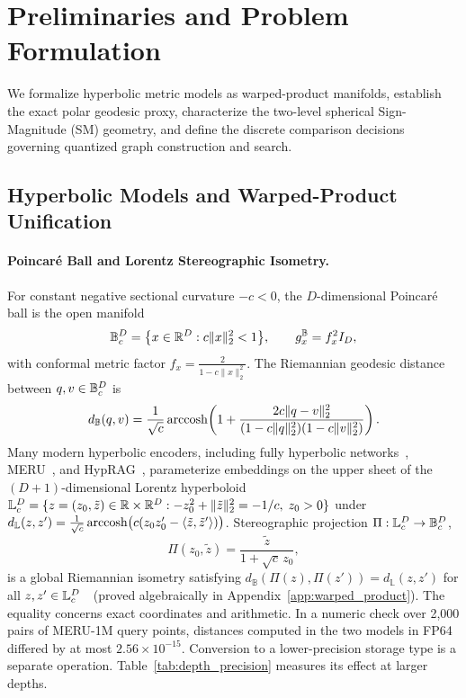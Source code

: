 \section{Preliminaries and Problem Formulation}
\label{sec:prelim}

We formalize hyperbolic metric models as warped-product manifolds, establish the exact polar geodesic proxy, characterize the two-level spherical Sign-Magnitude ({SM}) geometry, and define the discrete comparison decisions governing quantized graph construction and search.

\subsection{Hyperbolic Models and Warped-Product Unification}
\label{subsec:models}

\paragraph{{Poincar\'e} Ball and {Lorentz} Stereographic Isometry.}
For constant negative sectional curvature $-c < 0$, the $D$-dimensional {Poincar\'e} ball is the open manifold
\begin{equation}
  \mathbb{B}_c^D = \bigl\{x \in \mathbb{R}^D : c\|x\|_2^2 < 1\bigr\}, \qquad g_x^{\mathbb{B}} = f_x^2 I_D,
  \label{eq:poincare_manifold}
\end{equation}
with conformal metric factor $f_x = \frac{2}{1 - c\|x\|_2^2}$.
The Riemannian geodesic distance between $q, v \in \mathbb{B}_c^D$ is
\begin{equation}
  d_{\mathbb{B}}(q, v) = \frac{1}{\sqrt{c}}\operatorname{arccosh}\!\left(1 + \frac{2c\|q - v\|_2^2}{(1 - c\|q\|_2^2)(1 - c\|v\|_2^2)}\right).
  \label{eq:poincare_dist}
\end{equation}
Many modern hyperbolic encoders, including fully hyperbolic networks~\cite{chen2022fully}, {MERU}~\cite{desai2023meru}, and {HypRAG}~\cite{madhu2026hyprag}, parameterize embeddings on the upper sheet of the $(D+1)$-dimensional {Lorentz} hyperboloid
$\mathbb{L}_c^D = \{z = (z_0, \tilde{z}) \in \mathbb{R} \times \mathbb{R}^D : -z_0^2 + \|\tilde{z}\|_2^2 = -1/c,\; z_0 > 0\}$
under $d_{\mathbb{L}}(z, z') = \frac{1}{\sqrt{c}}\operatorname{arccosh}\bigl(c(z_0 z'_0 - \langle \tilde{z}, \tilde{z}'\rangle)\bigr)$.
Stereographic projection $\Pi : \mathbb{L}_c^D \to \mathbb{B}_c^D$,
\begin{equation}
  \Pi(z_0, \tilde{z}) = \frac{\tilde{z}}{1 + \sqrt{c}\,z_0},
  \label{eq:lorentz_isometry}
\end{equation}
is a global Riemannian isometry satisfying $d_{\mathbb{B}}(\Pi(z), \Pi(z')) = d_{\mathbb{L}}(z, z')$ for all $z, z' \in \mathbb{L}_c^D$~\cite{nickel2018lorentz}\ifpreprint\ (proved algebraically in Appendix~\ref{app:warped_product})\fi.
The equality concerns exact coordinates and arithmetic. In a numeric check over 2,000 pairs of {MERU-1M} query points, distances computed in the two models in FP64 differed by at most $2.56\times10^{-15}$. Conversion to a lower-precision storage type is a separate operation. Table~\ref{tab:depth_precision} measures its effect at larger depths.

